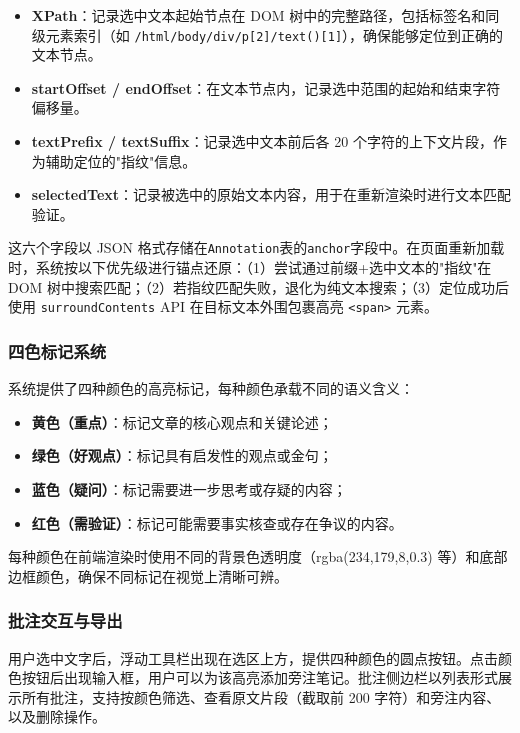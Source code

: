 \documentclass[12pt,a4paper]{ctexart}
\begin{document}
\begin{itemize}
  \item \textbf{XPath}：记录选中文本起始节点在 DOM 树中的完整路径，包括标签名和同级元素索引（如 \texttt{/html/body/div/p[2]/text()[1]}），确保能够定位到正确的文本节点。
  \item \textbf{startOffset / endOffset}：在文本节点内，记录选中范围的起始和结束字符偏移量。
  \item \textbf{textPrefix / textSuffix}：记录选中文本前后各 20 个字符的上下文片段，作为辅助定位的"指纹"信息。
  \item \textbf{selectedText}：记录被选中的原始文本内容，用于在重新渲染时进行文本匹配验证。
\end{itemize}

这六个字段以 JSON 格式存储在\texttt{Annotation}表的\texttt{anchor}字段中。在页面重新加载时，系统按以下优先级进行锚点还原：（1）尝试通过前缀+选中文本的"指纹"在 DOM 树中搜索匹配；（2）若指纹匹配失败，退化为纯文本搜索；（3）定位成功后使用 \texttt{surroundContents} API 在目标文本外围包裹高亮 \texttt{<span>} 元素。

\subsubsection{四色标记系统}

系统提供了四种颜色的高亮标记，每种颜色承载不同的语义含义：

\begin{itemize}
  \item \textbf{黄色（重点）}：标记文章的核心观点和关键论述；
  \item \textbf{绿色（好观点）}：标记具有启发性的观点或金句；
  \item \textbf{蓝色（疑问）}：标记需要进一步思考或存疑的内容；
  \item \textbf{红色（需验证）}：标记可能需要事实核查或存在争议的内容。
\end{itemize}

每种颜色在前端渲染时使用不同的背景色透明度（rgba(234,179,8,0.3) 等）和底部边框颜色，确保不同标记在视觉上清晰可辨。

\subsubsection{批注交互与导出}

用户选中文字后，浮动工具栏出现在选区上方，提供四种颜色的圆点按钮。点击颜色按钮后出现输入框，用户可以为该高亮添加旁注笔记。批注侧边栏以列表形式展示所有批注，支持按颜色筛选、查看原文片段（截取前 200 字符）和旁注内容、以及删除操作。
\end{document}
